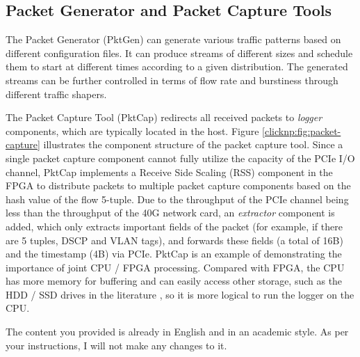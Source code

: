 
\subsection{Packet Generator and Packet Capture Tools}
The Packet Generator (PktGen) can generate various traffic patterns based on different configuration files. It can produce streams of different sizes and schedule them to start at different times according to a given distribution. The generated streams can be further controlled in terms of flow rate and burstiness through different traffic shapers.

The Packet Capture Tool (PktCap) redirects all received packets to \textit{logger} components, which are typically located in the host. Figure \ref{clicknp:fig:packet-capture} illustrates the component structure of the packet capture tool. Since a single packet capture component cannot fully utilize the capacity of the PCIe I/O channel, PktCap implements a Receive Side Scaling (RSS) component in the FPGA to distribute packets to multiple packet capture components based on the hash value of the flow 5-tuple. Due to the throughput of the PCIe channel being less than the throughput of the 40G network card, an \textit{extractor} component is added, which only extracts important fields of the packet (for example, if there are 5 tuples, DSCP and VLAN tags), and forwards these fields (a total of 16B) and the timestamp (4B) via PCIe. PktCap is an example of demonstrating the importance of joint CPU / FPGA processing. Compared with FPGA, the CPU has more memory for buffering and can easily access other storage, such as the HDD / SSD drives in the literature \cite{lee2015flosis}, so it is more logical to run the logger on the CPU.

The content you provided is already in English and in an academic style. As per your instructions, I will not make any changes to it.

